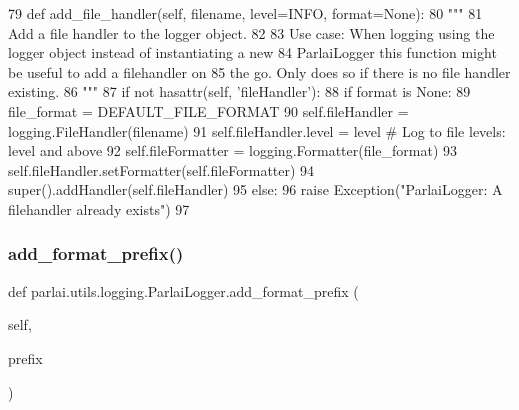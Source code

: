 \begin{DoxyCode}
79     \textcolor{keyword}{def }add\_file\_handler(self, filename, level=INFO, format=None):
80         \textcolor{stringliteral}{"""}
81 \textcolor{stringliteral}{        Add a file handler to the logger object.}
82 \textcolor{stringliteral}{}
83 \textcolor{stringliteral}{        Use case: When logging using the logger object instead of instantiating a new}
84 \textcolor{stringliteral}{        ParlaiLogger           this function might  be useful to add a filehandler on}
85 \textcolor{stringliteral}{        the go. Only does so if there is no file handler existing.}
86 \textcolor{stringliteral}{        """}
87         \textcolor{keywordflow}{if} \textcolor{keywordflow}{not} hasattr(self, \textcolor{stringliteral}{'fileHandler'}):
88             \textcolor{keywordflow}{if} format \textcolor{keywordflow}{is} \textcolor{keywordtype}{None}:
89                 file\_format = DEFAULT\_FILE\_FORMAT
90             self.fileHandler = logging.FileHandler(filename)
91             self.fileHandler.level = level  \textcolor{comment}{# Log to file levels: level and above}
92             self.fileFormatter = logging.Formatter(file\_format)
93             self.fileHandler.setFormatter(self.fileFormatter)
94             super().addHandler(self.fileHandler)
95         \textcolor{keywordflow}{else}:
96             \textcolor{keywordflow}{raise} Exception(\textcolor{stringliteral}{"ParlaiLogger: A filehandler already exists"})
97 
\end{DoxyCode}
\mbox{\label{classparlai_1_1utils_1_1logging_1_1ParlaiLogger_a160769d211d1700c2922c1ff65c83734}} 
\subsubsection{\texorpdfstring{add\+\_\+format\+\_\+prefix()}{add\_format\_prefix()}}
{\footnotesize\ttfamily def parlai.\+utils.\+logging.\+Parlai\+Logger.\+add\+\_\+format\+\_\+prefix (\begin{DoxyParamCaption}\item[{}]{self,  }\item[{}]{prefix }\end{DoxyParamCaption})}

